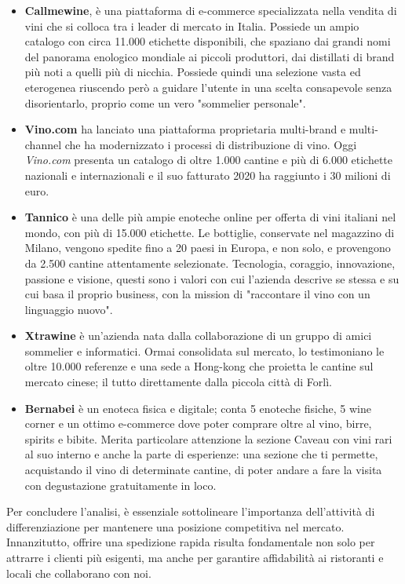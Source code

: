 \documentclass[12pt, a4paper]{article}
\newcommand{\meskip}{\medskip \\}
\begin{document}
\begin{itemize}
    \item \textbf{Callmewine}, è una piattaforma di e-commerce specializzata nella vendita di vini che si colloca tra i leader di mercato in Italia. Possiede un ampio catalogo con circa 11.000 etichette disponibili, che spaziano dai grandi nomi del panorama enologico mondiale ai piccoli produttori, dai distillati di brand più noti a quelli più di nicchia. Possiede quindi una selezione vasta ed eterogenea riuscendo però a guidare l'utente in una scelta consapevole senza disorientarlo, proprio come un vero "sommelier personale".
    \item \textbf{Vino.com} ha lanciato una piattaforma proprietaria multi-brand e multi-channel che ha modernizzato i processi di distribuzione di vino. Oggi \textit{Vino.com} presenta un catalogo di oltre 1.000 cantine e più di 6.000 etichette nazionali e internazionali e il suo fatturato 2020 ha raggiunto i 30 milioni di euro.
    \item \textbf{Tannico} è una delle più ampie enoteche online per offerta di vini italiani nel mondo, con più di 15.000 etichette. Le bottiglie, conservate nel magazzino di Milano, vengono spedite fino a 20 paesi in Europa, e non solo, e provengono da 2.500 cantine attentamente selezionate. Tecnologia, coraggio, innovazione, passione e visione, questi sono i valori con cui l'azienda descrive se stessa e su cui basa il proprio business, con la mission di "raccontare il vino con un linguaggio nuovo".
    \item \textbf{Xtrawine} è un'azienda nata dalla collaborazione di un gruppo di amici sommelier e informatici. Ormai consolidata sul mercato, lo testimoniano le oltre 10.000 referenze e una sede a Hong-kong che proietta le cantine sul mercato cinese; il tutto direttamente dalla piccola città di Forlì.
    \item \textbf{Bernabei} è un enoteca fisica e digitale; conta 5 enoteche fisiche, 5 wine corner e un ottimo e-commerce dove poter comprare oltre al vino, birre, spirits e bibite. Merita particolare attenzione la sezione Caveau con vini rari al suo interno e anche la parte di esperienze: una sezione che ti permette, acquistando il vino di determinate cantine, di poter andare a fare la visita con degustazione gratuitamente in loco.
\end{itemize}
Per concludere l'analisi, è essenziale sottolineare l'importanza dell'attività di differenziazione per mantenere una posizione competitiva nel mercato. Innanzitutto, offrire una spedizione rapida risulta fondamentale non solo per attrarre i clienti più esigenti, ma anche per garantire affidabilità ai ristoranti e locali che collaborano con noi.\meskip
\end{document}
